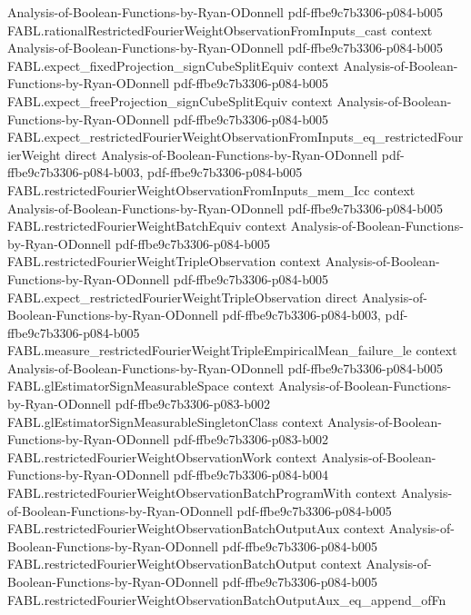 \begin{theorem}
  {Analysis-of-Boolean-Functions-by-Ryan-ODonnell}
  {pdf-ffbe9c7b3306-p084-b005}
\proofstep
  {FABL.rationalRestrictedFourierWeightObservationFromInputs_cast}
  {context}
  {Analysis-of-Boolean-Functions-by-Ryan-ODonnell}
  {pdf-ffbe9c7b3306-p084-b005}
\proofstep
  {FABL.expect_fixedProjection_signCubeSplitEquiv}
  {context}
  {Analysis-of-Boolean-Functions-by-Ryan-ODonnell}
  {pdf-ffbe9c7b3306-p084-b005}
\proofstep
  {FABL.expect_freeProjection_signCubeSplitEquiv}
  {context}
  {Analysis-of-Boolean-Functions-by-Ryan-ODonnell}
  {pdf-ffbe9c7b3306-p084-b005}
\proofstep
  {FABL.expect_restrictedFourierWeightObservationFromInputs_eq_restrictedFourierWeight}
  {direct}
  {Analysis-of-Boolean-Functions-by-Ryan-ODonnell}
  {pdf-ffbe9c7b3306-p084-b003,
    pdf-ffbe9c7b3306-p084-b005}
\proofstep
  {FABL.restrictedFourierWeightObservationFromInputs_mem_Icc}
  {context}
  {Analysis-of-Boolean-Functions-by-Ryan-ODonnell}
  {pdf-ffbe9c7b3306-p084-b005}
\proofstep
  {FABL.restrictedFourierWeightBatchEquiv}
  {context}
  {Analysis-of-Boolean-Functions-by-Ryan-ODonnell}
  {pdf-ffbe9c7b3306-p084-b005}
\proofstep
  {FABL.restrictedFourierWeightTripleObservation}
  {context}
  {Analysis-of-Boolean-Functions-by-Ryan-ODonnell}
  {pdf-ffbe9c7b3306-p084-b005}
\proofstep
  {FABL.expect_restrictedFourierWeightTripleObservation}
  {direct}
  {Analysis-of-Boolean-Functions-by-Ryan-ODonnell}
  {pdf-ffbe9c7b3306-p084-b003,
    pdf-ffbe9c7b3306-p084-b005}
\proofstep
  {FABL.measure_restrictedFourierWeightTripleEmpiricalMean_failure_le}
  {context}
  {Analysis-of-Boolean-Functions-by-Ryan-ODonnell}
  {pdf-ffbe9c7b3306-p084-b005}
\proofstep
  {FABL.glEstimatorSignMeasurableSpace}
  {context}
  {Analysis-of-Boolean-Functions-by-Ryan-ODonnell}
  {pdf-ffbe9c7b3306-p083-b002}
\proofstep
  {FABL.glEstimatorSignMeasurableSingletonClass}
  {context}
  {Analysis-of-Boolean-Functions-by-Ryan-ODonnell}
  {pdf-ffbe9c7b3306-p083-b002}
\proofstep
  {FABL.restrictedFourierWeightObservationWork}
  {context}
  {Analysis-of-Boolean-Functions-by-Ryan-ODonnell}
  {pdf-ffbe9c7b3306-p084-b004}
\proofstep
  {FABL.restrictedFourierWeightObservationBatchProgramWith}
  {context}
  {Analysis-of-Boolean-Functions-by-Ryan-ODonnell}
  {pdf-ffbe9c7b3306-p084-b005}
\proofstep
  {FABL.restrictedFourierWeightObservationBatchOutputAux}
  {context}
  {Analysis-of-Boolean-Functions-by-Ryan-ODonnell}
  {pdf-ffbe9c7b3306-p084-b005}
\proofstep
  {FABL.restrictedFourierWeightObservationBatchOutput}
  {context}
  {Analysis-of-Boolean-Functions-by-Ryan-ODonnell}
  {pdf-ffbe9c7b3306-p084-b005}
\proofstep
  {FABL.restrictedFourierWeightObservationBatchOutputAux_eq_append_ofFn}

\end{theorem}
